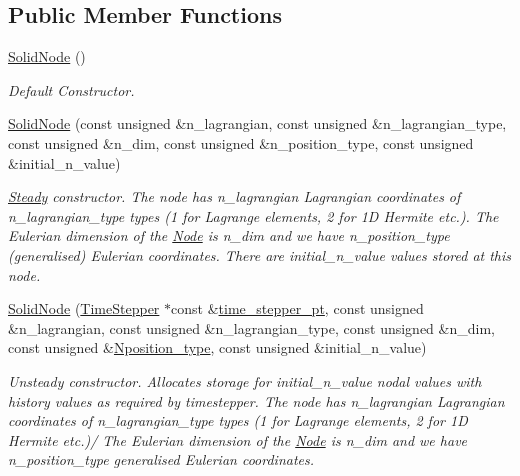 \subsection*{Public Member Functions}
\begin{DoxyCompactItemize}
\item 
\hyperlink{classoomph_1_1SolidNode_a7f6839c0a4abd087be6a68601b558da2}{Solid\+Node} ()
\begin{DoxyCompactList}\small\item\em Default Constructor. \end{DoxyCompactList}\item 
\hyperlink{classoomph_1_1SolidNode_ad8f4ed97c7124e7e55f1089bab99b9d7}{Solid\+Node} (const unsigned \&n\+\_\+lagrangian, const unsigned \&n\+\_\+lagrangian\+\_\+type, const unsigned \&n\+\_\+dim, const unsigned \&n\+\_\+position\+\_\+type, const unsigned \&initial\+\_\+n\+\_\+value)
\begin{DoxyCompactList}\small\item\em \hyperlink{classoomph_1_1Steady}{Steady} constructor. The node has n\+\_\+lagrangian Lagrangian coordinates of n\+\_\+lagrangian\+\_\+type types (1 for Lagrange elements, 2 for 1D Hermite etc.). The Eulerian dimension of the \hyperlink{classoomph_1_1Node}{Node} is n\+\_\+dim and we have n\+\_\+position\+\_\+type (generalised) Eulerian coordinates. There are initial\+\_\+n\+\_\+value values stored at this node. \end{DoxyCompactList}\item 
\hyperlink{classoomph_1_1SolidNode_a439c1ce56488d9fdc9c9511e1df9152d}{Solid\+Node} (\hyperlink{classoomph_1_1TimeStepper}{Time\+Stepper} $\ast$const \&\hyperlink{classoomph_1_1Data_a5b34970d16205921dca3ada720da8445}{time\+\_\+stepper\+\_\+pt}, const unsigned \&n\+\_\+lagrangian, const unsigned \&n\+\_\+lagrangian\+\_\+type, const unsigned \&n\+\_\+dim, const unsigned \&\hyperlink{classoomph_1_1Node_aa5419b3f46cb65976e1e1311eed9419d}{Nposition\+\_\+type}, const unsigned \&initial\+\_\+n\+\_\+value)
\begin{DoxyCompactList}\small\item\em Unsteady constructor. Allocates storage for initial\+\_\+n\+\_\+value nodal values with history values as required by timestepper. The node has n\+\_\+lagrangian Lagrangian coordinates of n\+\_\+lagrangian\+\_\+type types (1 for Lagrange elements, 2 for 1D Hermite etc.)/ The Eulerian dimension of the \hyperlink{classoomph_1_1Node}{Node} is n\+\_\+dim and we have n\+\_\+position\+\_\+type generalised Eulerian coordinates. \end{DoxyCompactList}\item 

\end{DoxyCompactItemize}
